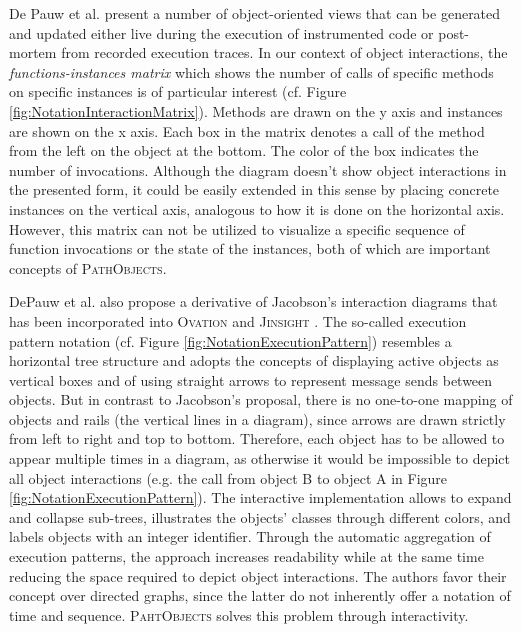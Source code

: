 De Pauw et al. present a number of object-oriented views \cite{de_pauw_visualizing_1993, tokoro_modeling_1994} that can be generated and updated either live during the execution of instrumented code or post-mortem from recorded execution traces.
In our context of object interactions, the \emph{functions-instances matrix} which shows the number of calls of specific methods on specific instances is of particular interest (cf. Figure \ref{fig:NotationInteractionMatrix}).
Methods are drawn on the y axis and instances are shown on the x axis.
Each box in the matrix denotes a call of the method from the left on the object at the bottom.
The color of the box indicates the number of invocations.
Although the diagram doesn't show object interactions in the presented form, it could be easily extended in this sense by placing concrete instances on the vertical axis, analogous to how it is done on the horizontal axis.
However, this matrix can not be utilized to visualize a specific sequence of function invocations or the state of the instances, both of which are important concepts of \textsc{PathObjects}.

DePauw et al. also propose a derivative of Jacobson's interaction diagrams \cite{de_pauw_execution_1998, jacobson_object-oriented_2004} that has been incorporated into \textsc{Ovation} \cite{de_pauw_visualizing_1993, tokoro_modeling_1994} and \textsc{Jinsight} \cite{de_pauw_visualizing_1998}.
The so-called execution pattern notation (cf. Figure \ref{fig:NotationExecutionPattern}) resembles a horizontal tree structure and adopts the concepts of displaying active objects as vertical boxes and of using straight arrows to represent message sends between objects.
But in contrast to Jacobson's proposal, there is no one-to-one mapping of objects and rails (the vertical lines in a diagram), since arrows are drawn strictly from left to right and top to bottom.
Therefore, each object has to be allowed to appear multiple times in a diagram, as otherwise it would be impossible to depict all object interactions (e.g. the call from object B to object A in Figure \ref{fig:NotationExecutionPattern}).
The interactive implementation allows to expand and collapse sub-trees, illustrates the objects' classes through different colors, and labels objects with an integer identifier.
Through the automatic aggregation of execution patterns, the approach increases readability while at the same time reducing the  space required to depict object interactions.
The authors favor their concept over directed graphs, since the latter do not inherently offer a notation of time and sequence.
\textsc{PahtObjects} solves this problem through interactivity.

